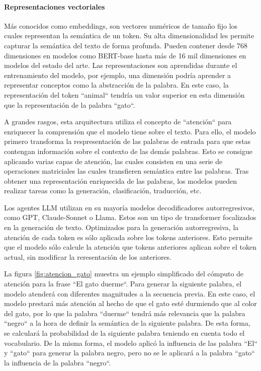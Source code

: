 \paragraph{Representaciones vectoriales}
Más conocidos como embeddings, son vectores numéricos de tamaño fijo los cuales representan la semántica de un token. Su alta dimensionalidad les permite capturar la semántica del texto de forma profunda. Pueden contener desde 768 dimensiones en modelos como BERT-base hasta más de 16 mil dimensiones en modelos del estado del arte. Las representaciones son aprendidas durante el entrenamiento del modelo, por ejemplo, una dimensión podría aprender a representar conceptos como la abstracción de la palabra. En este caso, la representación del token ``animal`` tendría un valor superior en esta dimensión que la representación de la palabra ``gato``.

A grandes rasgos, esta arquitectura utiliza el concepto de ``atención`` para enriquecer la comprensión que el modelo tiene sobre el texto. Para ello, el modelo primero transforma la respresentación de las palabras de entrada para que estas contengan información sobre el contexto de las demás palabras. Esto se consigue aplicando varias capas de atención, las cuales consisten en una serie de operaciones matriciales las cuales transfieren semántica entre las palabras. Tras obtener una representación enriquecida de las palabras, los modelos pueden realizar tareas como la generación, clasificación, traducción, etc.

Los agentes LLM utilizan en su mayoría modelos decodificadores autorregresivos, como GPT, Claude-Sonnet o Llama. Estos son un tipo de transformer focalizados en la generación de texto. Optimizados para la generación autorregresiva, la atención de cada token es sólo aplicada sobre los tokens anteriores. Esto permite que el modelo sólo calcule la atención que tokens anteriores aplican sobre el token actual, sin modificar la reresentación de los anteriores. 

La figura \ref{fig:atencion_gato} muestra un ejemplo simplificado del cómputo de atención para la frase ``El gato duerme``. Para generar la siguiente palabra, el modelo atenderá con diferentes magnitudes a la secuencia previa. En este caso, el modelo prestará más atención al hecho de que el gato esté durmiendo que al color del gato, por lo que la palabra  ``duerme`` tendrá más relevancia que la palabra ``negro`` a la hora de definir la semántica de la siguiente palabra. De esta forma, se calculará la probabilidad de la siguiente palabra teniendo en cuenta todo el vocabulario. De la misma forma, el modelo aplicó la influencia de las palabra ``El`` y ``gato`` para generar la palabra negro, pero no se le aplicará a la palabra ``gato`` la influencia de la palabra ``negro``.

